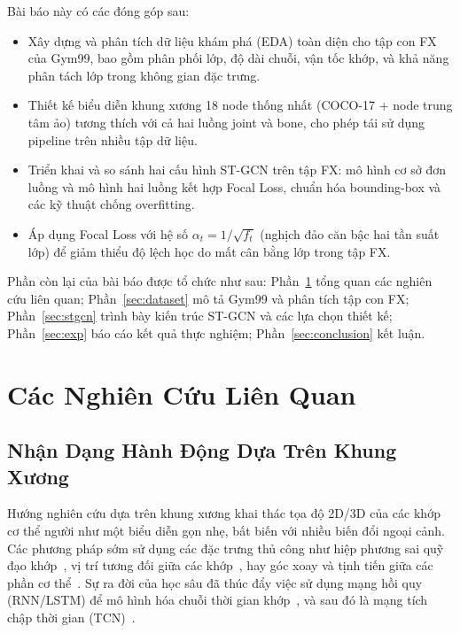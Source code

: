 \documentclass[conference]{IEEEtran}
\begin{document}
Bài báo này có các đóng góp sau:
\begin{itemize}
  \item Xây dựng và phân tích dữ liệu khám phá (EDA) toàn diện cho tập
        con FX của Gym99, bao gồm phân phối lớp, độ dài chuỗi, vận tốc
        khớp, và khả năng phân tách lớp trong không gian đặc trưng.
  \item Thiết kế biểu diễn khung xương 18 node thống nhất
        (COCO-17 + node trung tâm ảo) tương thích với cả hai luồng joint
        và bone, cho phép tái sử dụng pipeline trên nhiều tập dữ liệu.
  \item Triển khai và so sánh hai cấu hình ST-GCN trên tập FX: mô hình
        cơ sở đơn luồng và mô hình hai luồng kết hợp Focal Loss,
        chuẩn hóa bounding-box và các kỹ thuật chống overfitting.
  \item Áp dụng Focal Loss với hệ số $\alpha_t = 1/\sqrt{f_t}$ (nghịch
        đảo căn bậc hai tần suất lớp) để giảm thiểu độ lệch học do mất
        cân bằng lớp trong tập FX.
\end{itemize}

Phần còn lại của bài báo được tổ chức như sau: Phần~\ref{sec:related}
tổng quan các nghiên cứu liên quan; Phần~\ref{sec:dataset} mô tả Gym99
và phân tích tập con FX; Phần~\ref{sec:stgcn} trình bày kiến trúc ST-GCN
và các lựa chọn thiết kế; Phần~\ref{sec:exp} báo cáo kết quả thực
nghiệm; Phần~\ref{sec:conclusion} kết luận.

\section{Các Nghiên Cứu Liên Quan}
\label{sec:related}

\subsection{Nhận Dạng Hành Động Dựa Trên Khung Xương}

Hướng nghiên cứu dựa trên khung xương khai thác tọa độ 2D/3D của các
khớp cơ thể người như một biểu diễn gọn nhẹ, bất biến với nhiều biến
đổi ngoại cảnh. Các phương pháp sớm sử dụng các đặc trưng thủ công như
hiệp phương sai quỹ đạo khớp~\cite{hussein2013covariance}, vị trí tương
đối giữa các khớp~\cite{wang2012mining}, hay góc xoay và tịnh tiến giữa
các phần cơ thể~\cite{vemulapalli2014human}. Sự ra đời của học sâu đã
thúc đẩy việc sử dụng mạng hồi quy (RNN/LSTM) để mô hình hóa chuỗi
thời gian khớp~\cite{shahroudy2016ntu,liu2016spatio}, và sau đó là mạng
tích chập thời gian (TCN)~\cite{kim2017interpretable}.
\end{document}
